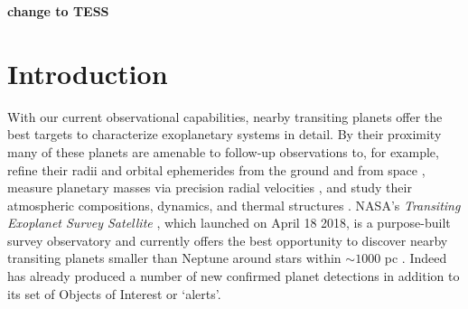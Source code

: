 
\textbf{change \tess{} to TESS}


\section{Introduction}
With our current observational capabilities, nearby transiting planets offer the best targets
to characterize exoplanetary systems in detail. By their proximity many of
these planets are amenable to follow-up observations to, for example, refine their radii and orbital
ephemerides from the ground \citep{stefansson17,cooke18} and from space \citep{broeg13,gaidos17},
measure planetary masses via precision radial velocities \citep{cloutier18b}, and study
their atmospheric compositions, dynamics, and thermal structures \citep{louie18,kempton18}. NASA's
\emph{Transiting Exoplanet Survey Satellite} \citep[\tess{;}][]{ricker15}, which launched on April 18
2018, is a purpose-built survey observatory and currently offers the best opportunity to discover
nearby transiting planets smaller than Neptune around stars within $\sim 1000$ pc \citep{stassun17}.
Indeed \tess{} has already produced a number of new confirmed planet detections
\citep{esposito18,gandolfi18,huang18a,trifonov18,vanderspek18} %
in addition to its set of \tess{} Objects of Interest or \tess{} `alerts'. \\

